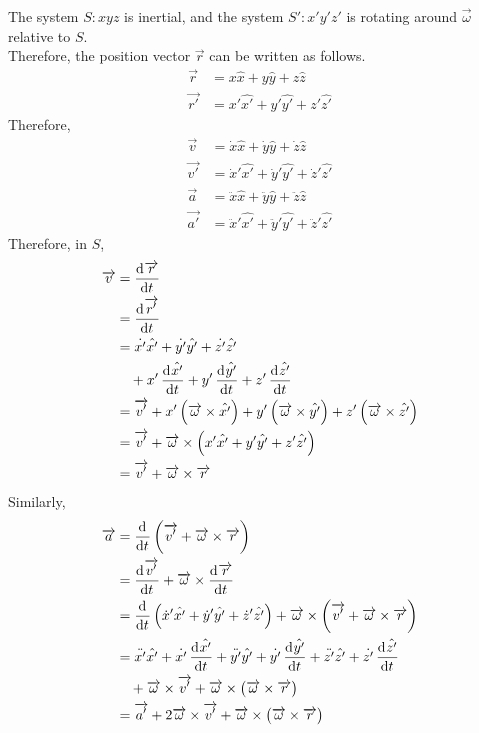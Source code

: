 \documentclass[fleqn, a4paper, 12pt]{article}
\theoremstyle{definition}
\theoremstyle{theorem}
\begin{document}
The system $S : x y z$ is inertial, and the system $S' : x' y' z'$ is rotating around $\overrightarrow{\omega}$ relative to $S$.\\
Therefore, the position vector $\overrightarrow{r}$ can be written as follows.
\begin{align*}
	\overrightarrow{r} &= x \hat{x} + y \hat{y} + z \hat{z}\\
	\overrightarrow{r'} &= x' \hat{x'} + y' \hat{y'} + z' \hat{z'}	
\end{align*}
Therefore,
\begin{align*}
	\overrightarrow{v} &= \dot{x} \hat{x} + \dot{y} \hat{y} + \dot{z} \hat{z}\\
	\overrightarrow{v'} &= \dot{x}' \hat{x'} + \dot{y}' \hat{y'} + \dot{z}' \hat{z'}\\
	\overrightarrow{a} &= \ddot{x} \hat{x} + \ddot{y} \hat{y} + \ddot{z} \hat{z}\\
	\overrightarrow{a'} &= \ddot{x}' \hat{x'} + \ddot{y}' \hat{y'} + \ddot{z}' \hat{z'}
\end{align*}
Therefore, in $S$,
\begin{align*}
	\overrightarrow{v} &= \dod{\overrightarrow{r}}{t}\\
	&= \dod{\overrightarrow{r'}}{t}\\
	&= \dot{x'} \hat{x'} + \dot{y'} \hat{y'} + \dot{z'} \hat{z'}\\
	&\quad + x' \dod{\hat{x'}}{t} + y' \dod{\hat{y'}}{t} + z' \dod{\hat{z'}}{t}\\
	&= \overrightarrow{v'} + x' \left( \overrightarrow{\omega} \times \hat{x'} \right) + y' \left( \overrightarrow{\omega} \times \hat{y'} \right) + z' \left( \overrightarrow{\omega} \times \hat{z'} \right)\\
	&= \overrightarrow{v'} + \overrightarrow{\omega} \times \left( x' \hat{x'} + y' \hat{y'} + z' \hat{z'} \right)\\
	&= \overrightarrow{v'} + \overrightarrow{\omega} \times \overrightarrow{r}
\end{align*}
Similarly,
\begin{align*}
	\overrightarrow{a} &= \dod{}{t} \left( \overrightarrow{v'} + \overrightarrow{\omega} \times \overrightarrow{r} \right)\\
	&= \dod{\overrightarrow{v'}}{t} + \overrightarrow{\omega} \times \dod{\overrightarrow{r}}{t}\\
	&= \dod{}{t} \left( \dot{x}' \hat{x'} + \dot{y}' \hat{y'} + \dot{z}' \hat{z'} \right) + \overrightarrow{\omega} \times \left( \overrightarrow{v'} + \overrightarrow{\omega} \times \overrightarrow{r} \right)\\
	&= \ddot{x'} \hat{x'} + \dot{x'} \dod{\hat{x'}}{t} + \ddot{y'} \hat{y'} + \dot{y'} \dod{\hat{y'}}{t} + \ddot{z'} \hat{z'} + \dot{z'} \dod{\hat{z'}}{t}\\
	&\quad + \overrightarrow{\omega} \times \overrightarrow{v'} + \overrightarrow{\omega} \times \left( \overrightarrow{\omega} \times \overrightarrow{r} \right)\\
	&= \overrightarrow{a'} + 2 \overrightarrow{\omega} \times \overrightarrow{v'} + \overrightarrow{\omega} \times \left( \overrightarrow{\omega} \times \overrightarrow{r} \right)
\end{align*}
\end{document}
